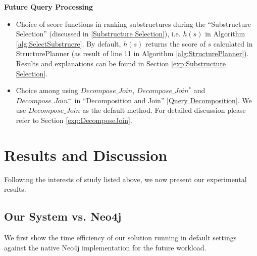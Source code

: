 \textbf{Future Query Processing}
\begin{itemize}
	\item  Choice of score functions in ranking substructures during the  ``Substructure Selection'' (discussed in \ref{Substructure Selection}), i.e. $h(s)$ in Algorithm \ref{alg:SelectSubstrucre}. By default, $h(s)$ returns the score of $s$ calculated in StructurePlanner (as result of line 11 in Algorithm \ref{alg:StructurePlanner}). Results and explanations can be found in Section \ref{exp:Substructure Selection}.
	
	\item  Choice among using $Decompose\_Join$, $Decompose\_Join^{*}$ and $Decompose\_Join^{+}$ in ``Decomposition and Join'' \ref{Query Decomposition}. We use $Decompose\_Join$ as the default method. For detailed discussion please refer to Section \ref{exp:DecomposeJoin}.
	
\end{itemize}


\section{Results and Discussion}
\label{Results and Discussion}
Following the interests of study listed above, we now present our experimental results.

\subsection{Our System vs. Neo4j}
\label{Our System vs. Neo4j}
We first show the time efficiency of our solution running in default settings against the native Neo4j implementation for the future workload.


